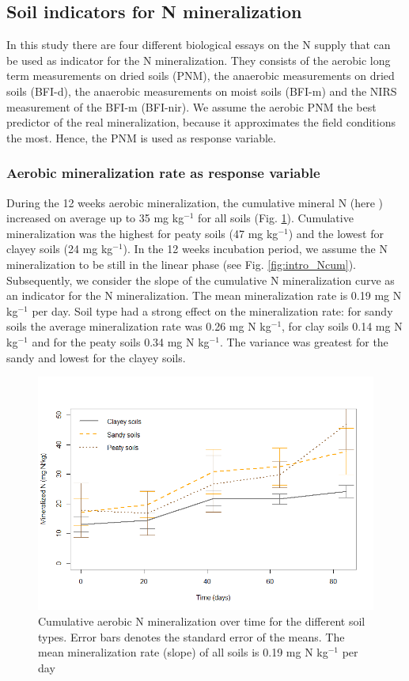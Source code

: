 \documentclass[10pt,twoside,dutch,english]{report}
\begin{document}
\subsection{Soil indicators for N mineralization} 
In this study there are four different biological essays on the N supply that can be used as indicator for the N mineralization. They consists of the aerobic long term measurements on dried soils (PNM), the anaerobic measurements on dried soils (BFI-d), the anaerobic measurements on moist soils (BFI-m) and the NIRS measurement of the BFI-m (BFI-nir). We assume the aerobic PNM the best predictor of the real mineralization, because it approximates the field conditions the most. Hence, the PNM is used as response variable. 

 \subsubsection{Aerobic mineralization rate as response variable} 
During the 12 weeks aerobic mineralization, the cumulative mineral N (here ) increased on average up to 35 mg kg$^{-1}$ for all soils (Fig. \ref{fig:results_Ncum}). Cumulative mineralization was the highest for peaty soils (47 mg kg$^{-1}$) and the lowest for clayey soils (24 mg kg$^{-1}$).  In the 12 weeks incubation period, we assume the N mineralization to be still in the linear phase (see Fig. \ref{fig:intro_Ncum}). Subsequently, we consider the slope of the cumulative N mineralization curve as an indicator for the N mineralization. The mean mineralization rate  is 0.19 mg N kg$^{-1}$ per day. Soil type had a strong effect on the mineralization rate: for sandy soils the average mineralization rate was 0.26 mg N kg$^{-1}$, for clay soils 0.14 mg N kg$^{-1}$  and for the peaty soils 0.34 mg N kg$^{-1}$. The variance was greatest for the sandy and lowest for the clayey soils. 
	\begin{figure}[h] %
	\centering
	\includegraphics[width=0.8\linewidth]{results_Ncum}
	\caption{Cumulative aerobic N mineralization over time for the different soil types. Error bars denotes the standard error of the means. The mean mineralization rate (slope) of all soils is 0.19 mg N kg$^{-1}$ per day}
	\label{fig:results_Ncum}
\end{figure}
\end{document}
